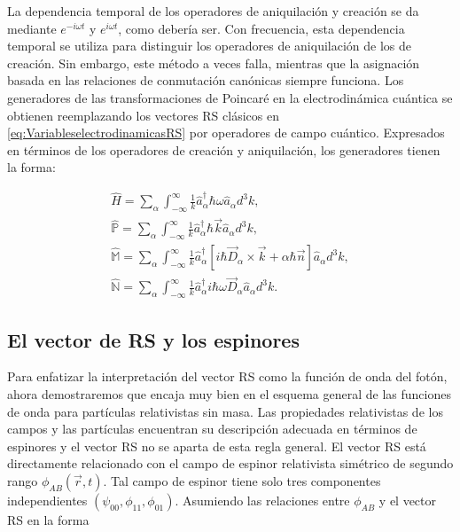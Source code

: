             La dependencia temporal de los operadores de aniquilación y creación se da mediante $e^{-i\omega t}$ y $e^{i\omega t}$, como debería ser. Con frecuencia, esta dependencia temporal se utiliza para distinguir los operadores de aniquilación de los de creación. Sin embargo, este método a veces falla, mientras que la asignación basada en las relaciones de conmutación canónicas siempre funciona. Los generadores de las transformaciones de Poincaré en la electrodinámica cuántica se obtienen reemplazando los vectores RS clásicos en \ref{eq:VariableselectrodinamicasRS} por operadores de campo cuántico. Expresados en términos de los operadores de creación y aniquilación, los generadores tienen la forma:

            \begin{align}\label{eq:PoincaréQunatumF}
                \hat{H} = \sum_{\alpha}\int_{-\infty}^{\infty}\frac{1}{k}\hat{a}^{\dagger}_\alpha\hbar\omega\hat{a}_{\alpha}d^3k,\\
                \hat{\mathbb{P}} = \sum_{\alpha}\int_{-\infty}^{\infty}\frac{1}{k}\hat{a}_{\alpha}^{\dagger}\hbar\Vec{k}\hat{a}_{\alpha}d^3k,\\
                \hat{\mathbb{M}} = \sum_{\alpha}\int_{-\infty}^{\infty}\frac{1}{k}\hat{a}_{\alpha}^{\dagger}\left[ i\hbar\Vec{D}_{\alpha}\times \Vec{k} + \alpha\hbar\Vec{n}\right]\hat{a}_{\alpha}d^3k,\\
                \hat{\mathbb{N}} = \sum_{\alpha}\int_{-\infty}^{\infty}\frac{1}{k}\hat{a}^{\dagger}_{\alpha}i\hbar\omega\Vec{D}_{\alpha}\hat{a}_{\alpha}d^3k.
            \end{align}
        
        

        \subsection{El vector de RS y los espinores}

            Para enfatizar la interpretación del vector RS como la función de onda del fotón, ahora demostraremos que encaja muy bien en el esquema general de las funciones de onda para partículas relativistas sin masa. Las propiedades relativistas de los campos y las partículas encuentran su descripción adecuada en términos de espinores y el vector RS no se aparta de esta regla general. El vector RS está directamente relacionado con el campo de espinor relativista simétrico de segundo rango $\phi_{AB}(\Vec{r},t)$. Tal campo de espinor tiene solo tres componentes independientes $(\psi_{00},\phi_{11},\phi_{01})$. Asumiendo las relaciones entre $\phi_{AB}$ y el vector RS en la forma

